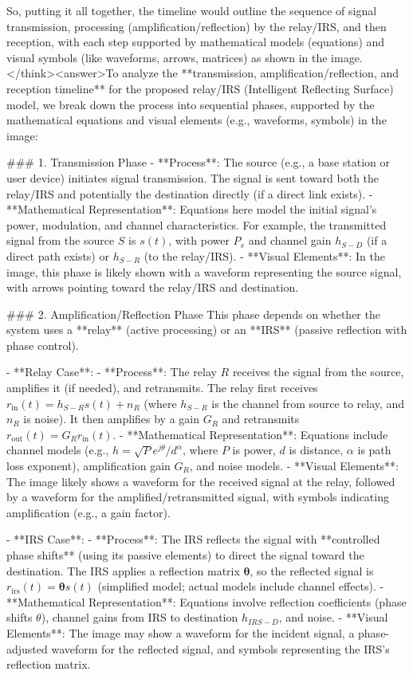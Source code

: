 So, putting it all together, the timeline would outline the sequence of signal transmission, processing (amplification/reflection) by the relay/IRS, and then reception, with each step supported by mathematical models (equations) and visual symbols (like waveforms, arrows, matrices) as shown in the image.</think><answer>To analyze the **transmission, amplification/reflection, and reception timeline** for the proposed relay/IRS (Intelligent Reflecting Surface) model, we break down the process into sequential phases, supported by the mathematical equations and visual elements (e.g., waveforms, symbols) in the image:  


### 1. Transmission Phase  
- **Process**: The source (e.g., a base station or user device) initiates signal transmission. The signal is sent toward both the relay/IRS and potentially the destination directly (if a direct link exists).  
- **Mathematical Representation**: Equations here model the initial signal’s power, modulation, and channel characteristics. For example, the transmitted signal from the source \( S \) is \( s(t) \), with power \( P_s \) and channel gain \( h_{S-D} \) (if a direct path exists) or \( h_{S-R} \) (to the relay/IRS).  
- **Visual Elements**: In the image, this phase is likely shown with a waveform representing the source signal, with arrows pointing toward the relay/IRS and destination.  


### 2. Amplification/Reflection Phase  
This phase depends on whether the system uses a **relay** (active processing) or an **IRS** (passive reflection with phase control).  

- **Relay Case**:  
  - **Process**: The relay \( R \) receives the signal from the source, amplifies it (if needed), and retransmits. The relay first receives \( r_{\text{in}}(t) = h_{S-R} s(t) + n_R \) (where \( h_{S-R} \) is the channel from source to relay, and \( n_R \) is noise). It then amplifies by a gain \( G_R \) and retransmits \( r_{\text{out}}(t) = G_R r_{\text{in}}(t) \).  
  - **Mathematical Representation**: Equations include channel models (e.g., \( h = \sqrt{P} e^{j\theta} / d^\alpha \), where \( P \) is power, \( d \) is distance, \( \alpha \) is path loss exponent), amplification gain \( G_R \), and noise models.  
  - **Visual Elements**: The image likely shows a waveform for the received signal at the relay, followed by a waveform for the amplified/retransmitted signal, with symbols indicating amplification (e.g., a gain factor).  

- **IRS Case**:  
  - **Process**: The IRS reflects the signal with **controlled phase shifts** (using its passive elements) to direct the signal toward the destination. The IRS applies a reflection matrix \( \boldsymbol{\theta} \), so the reflected signal is \( r_{\text{irs}}(t) = \boldsymbol{\theta} s(t) \) (simplified model; actual models include channel effects).  
  - **Mathematical Representation**: Equations involve reflection coefficients (phase shifts \( \theta \)), channel gains from IRS to destination \( h_{IRS-D} \), and noise.  
  - **Visual Elements**: The image may show a waveform for the incident signal, a phase-adjusted waveform for the reflected signal, and symbols representing the IRS’s reflection matrix.  

